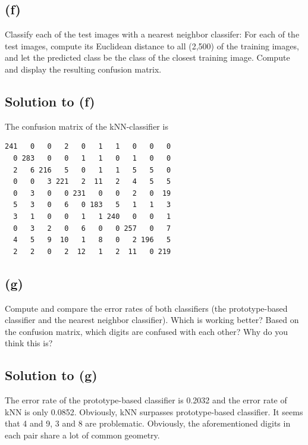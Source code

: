 \documentclass[10pt]{article}
\begin{document}
\subsection*{(f)}
\color{blue}
Classify each of the test images with a nearest neighbor classifer: For each of the test images, compute its Euclidean distance to all (2,500) of the training images, and let the predicted class be the class of the closest training image. Compute and display the resulting confusion matrix.
\color{black}

\subsection*{Solution to (f)}
The confusion matrix of the kNN-classifier is
\begin{verbatim}
241   0   0   2   0   1   1   0   0   0
  0 283   0   0   1   1   0   1   0   0
  2   6 216   5   0   1   1   5   5   0
  0   0   3 221   2  11   2   4   5   5
  0   3   0   0 231   0   0   2   0  19
  5   3   0   6   0 183   5   1   1   3
  3   1   0   0   1   1 240   0   0   1
  0   3   2   0   6   0   0 257   0   7
  4   5   9  10   1   8   0   2 196   5
  2   2   0   2  12   1   2  11   0 219
\end{verbatim}

\subsection*{(g)}
\color{blue}
Compute and compare the error rates of both classifiers (the prototype-based classifier and the nearest neighbor classifier). Which is working better?  Based on the confusion matrix, which digits are confused with each other? Why do you think this is?
\color{black}

\subsection*{Solution to (g)}
The error rate of the prototype-based classifier is 0.2032 and the error rate of kNN is only 0.0852. Obviously, kNN surpasses prototype-based classifier. It seems that 4 and 9, 3 and 8 are problematic. Obviously, the aforementioned digits in each pair share a lot of common geometry.
\end{document}
